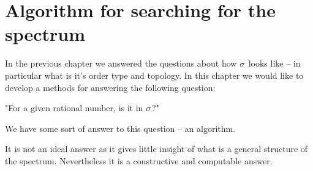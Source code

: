\chapter{Algorithm for searching for the spectrum}\label{Searching the spectrum}

In the previous chapter we answered the questions about how ${\sigma}$ looks like -- in particular 
what is it's order type and topology. In this chapter we would like to develop a 
methods for answering the 
following question: 

"For a given rational number, is it in ${\sigma}$?" 

We have some sort of answer to this question -- an algorithm.

It is not an ideal answer as it gives little insight of what is a general structure 
of the spectrum. Nevertheless it is a constructive and computable answer. 











